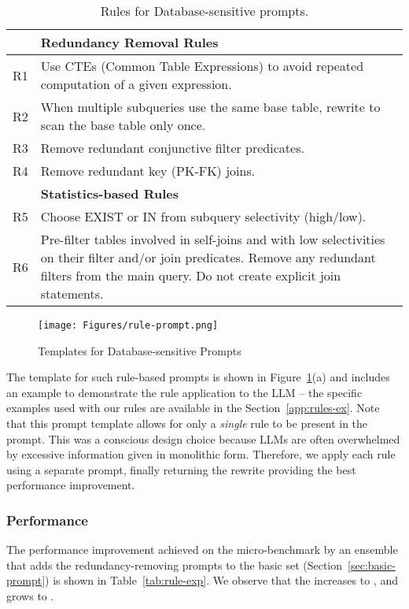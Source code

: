 \begin{table}[!h]
\footnotesize
\centering
\caption{Rules for Database-sensitive prompts.}
\label{tab:llm-rules}
\begin{tabular}{|p{0.3cm}|p{12cm}|}
\hline
& \textbf{Redundancy Removal Rules}  \\ \hline
R1 & Use CTEs (Common Table Expressions) to avoid repeated computation of a given expression.\\ \hline
R2 & When multiple subqueries use the same base table, rewrite to scan the base table only once.\\ \hline
R3 & Remove redundant conjunctive filter predicates.\\ \hline
R4 & Remove redundant key (PK-FK) joins.\\ \hline 
& \textbf{Statistics-based Rules} \\ \hline
R5 & Choose EXIST or IN from subquery selectivity (high/low).\\ \hline
R6 & Pre-filter tables involved in self-joins and with low selectivities on their filter and/or join predicates. Remove any redundant filters from the main query. Do not create explicit join statements.\\ \hline
\end{tabular}
\vspace{-0.1in}
\end{table}

\begin{figure}[t]
    \centering
    \texttt{[image: Figures/rule-prompt.png]}
    \vspace{-0.1cm}
    \caption{Templates for Database-sensitive Prompts}
    \label{fig:rule-prompts}
    \vspace{-0.1cm}
\end{figure}

The template for such rule-based prompts is shown in Figure~\ref{fig:rule-prompts}(a) and includes an example to demonstrate the rule application to the LLM -- the specific examples used with our rules are available in the Section~\ref{app:rules-ex}.
%
Note that this prompt template allows for only a \emph{single} rule to be present in the prompt. This was a conscious design choice because LLMs are often overwhelmed by excessive information given in monolithic form. Therefore, we apply each rule using a separate prompt,  finally returning the rewrite providing the best performance improvement.

\subsubsection*{Performance}
The performance improvement achieved on the micro-benchmark by an ensemble that adds the redundancy-removing prompts to the basic set (Section~\ref{sec:basic-prompt}) is shown in Table~\ref{tab:rule-exp}. We observe that the \cpr increases to \textbf{\RedRewriteMicroDS}, and \csgm grows to \textbf{\gmRedMicroDS}.

